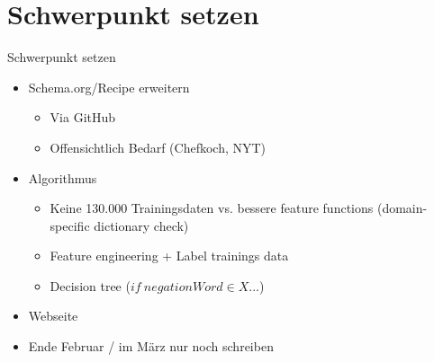\documentclass[12pt]{beamer}
\begin{document}
\section{Schwerpunkt setzen}
\begin{frame}{Schwerpunkt setzen}
	\begin{itemize}
		\item Schema.org/Recipe erweitern
			\begin{itemize}
				\item Via GitHub
				\item Offensichtlich Bedarf (Chefkoch, NYT)
			\end{itemize}
		\item Algorithmus
		\begin{itemize}
			\item Keine 130.000 Trainingsdaten vs. bessere feature functions (domain-specific dictionary check)
			\item Feature engineering + Label trainings data
			\item Decision tree ($if\ negationWord \in X...$)
		\end{itemize}
		\item Webseite
		
		\vspace{0.5cm}
		\item Ende Februar / im März nur noch schreiben
	\end{itemize}
\end{frame}
\end{document}
